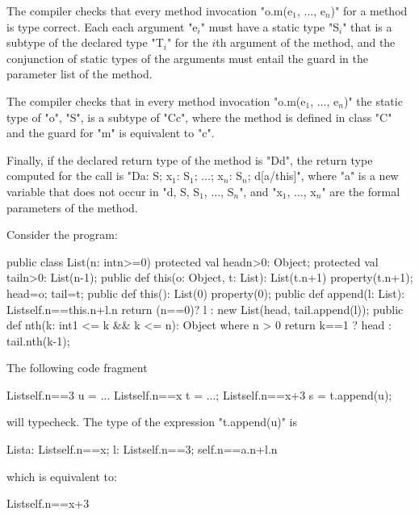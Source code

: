 \begin{staticrule*}
    The compiler checks that every method invocation
    \xcdmath"o.m(e$_1$, $\dots$, e$_n$)"
    for a method is type correct. Each each argument
    \xcdmath"e$_i$" must have a
    static type \xcdmath"S$_i$" that is a subtype of the declared type
    \xcdmath"T$_i$" for the $i$th
    argument of the method, and the conjunction of static types
    of the arguments must entail the guard in the parameter list
    of the method.

    The compiler checks that in every method invocation
    \xcdmath"o.m(e$_1$, $\dots$, e$_n$)"
    the static type of \xcd"o", \xcd"S", is a subtype of \xcd"C{c}", where the method
    is defined in class \xcd"C" and the guard for \xcd"m" is equivalent to
    \xcd"c".

    Finally, if the declared return type of the method is
    \xcd"D{d}", the
    return type computed for the call is
    \xcdmath"D{a: S; x$_1$: S$_1$; $\dots$; x$_n$: S$_n$; d[a/this]}",
    where \xcd"a" is a new
    variable that does not occur in
    \xcdmath"d, S, S$_1$, $\dots$, S$_n$", and
    \xcdmath"x$_1$, $\dots$, x$_n$" are the formal
    parameters of the method.
\end{staticrule*}

\begin{example}
Consider the program:
\begin{xten}
public class List(n: int{n>=0}) {
  protected val head{n>0}: Object;
  protected val tail{n>0}: List(n-1);
  public def this(o: Object, t: List): List(t.n+1) {
     property(t.n+1);
     head=o;
     tail=t;
  }
  public def this(): List(0) {
     property(0);
  }
  public def append(l: List): List{self.n==this.n+l.n} {
      return (n==0)? l
         : new List(head, tail.append(l)); 
  }
  public def nth(k: int{1 <= k && k <= n}): Object
    where n > 0 {
      return k==1 ? head : tail.nth(k-1);
  }
}
\end{xten}

The following code fragment
\begin{xten}
List{self.n==3} u = ...
List{self.n==x} t = ...;
List{self.n==x+3} s = t.append(u);
\end{xten}
\noindent will typecheck. The type of the expression \xcd"t.append(u)" is 
\begin{xten}
List{a: List{self.n==x}; 
     l: List{self.n==3}; self.n==a.n+l.n}  
\end{xten}
\noindent which is equivalent to:
\begin{xten}
List{self.n==x+3}
\end{xten}
\end{example}

